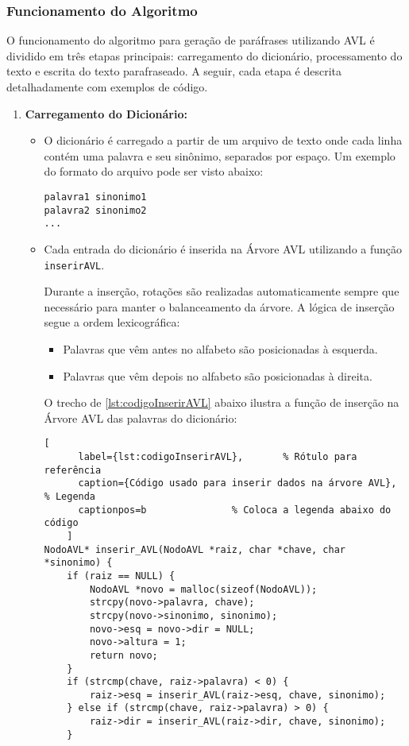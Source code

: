 \documentclass[a4paper, 12pt, english]{article}
\begin{document}
\subsubsection{Funcionamento do Algoritmo}
O funcionamento do algoritmo para geração de paráfrases utilizando AVL é dividido em três etapas principais: carregamento do dicionário, processamento do texto e escrita do texto parafraseado. A seguir, cada etapa é descrita detalhadamente com exemplos de código.
\begin{enumerate}
\item \textbf{Carregamento do Dicionário:}
\begin{itemize}
\item O dicionário é carregado a partir de um arquivo de texto onde cada linha contém uma palavra e seu sinônimo, separados por espaço. Um exemplo do formato do arquivo pode ser visto abaixo:
\begin{verbatim}
palavra1 sinonimo1
palavra2 sinonimo2
...
\end{verbatim}
\item Cada entrada do dicionário é inserida na Árvore AVL utilizando a função \texttt{inserirAVL}. 

Durante a inserção, rotações são realizadas automaticamente sempre que necessário para manter o balanceamento da árvore. A lógica de inserção segue a ordem lexicográfica:
\begin{itemize}
\item Palavras que vêm antes no alfabeto são posicionadas à esquerda.
\item Palavras que vêm depois no alfabeto são posicionadas à direita.
\end{itemize}
\newpage

O trecho de \autoref{lst:codigoInserirAVL} abaixo ilustra a função de inserção na Árvore AVL das palavras do dicionário:

    \begin{lstlisting}[
      label={lst:codigoInserirAVL},       % Rótulo para referência
      caption={Código usado para inserir dados na árvore AVL}, % Legenda
      captionpos=b               % Coloca a legenda abaixo do código
    ]
NodoAVL* inserir_AVL(NodoAVL *raiz, char *chave, char *sinonimo) {
    if (raiz == NULL) {
        NodoAVL *novo = malloc(sizeof(NodoAVL));
        strcpy(novo->palavra, chave);
        strcpy(novo->sinonimo, sinonimo);
        novo->esq = novo->dir = NULL;
        novo->altura = 1;
        return novo;
    }
    if (strcmp(chave, raiz->palavra) < 0) {
        raiz->esq = inserir_AVL(raiz->esq, chave, sinonimo);
    } else if (strcmp(chave, raiz->palavra) > 0) {
        raiz->dir = inserir_AVL(raiz->dir, chave, sinonimo);
    }


\end{lstlisting}
\end{itemize}
\end{enumerate}
\end{document}
